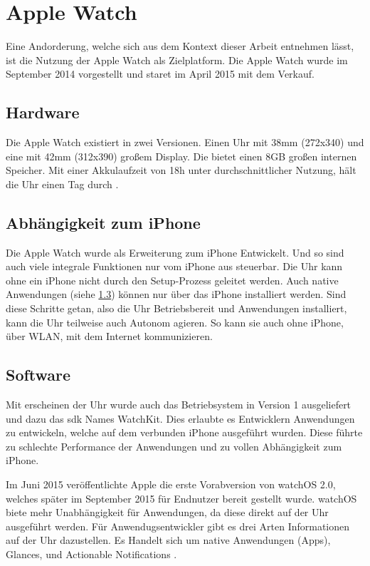 \section{Apple Watch}
\label{ch:apple-watch}
Eine Andorderung, welche sich aus dem Kontext dieser Arbeit entnehmen lässt, ist die Nutzung der Apple Watch als Zielplatform. Die Apple Watch wurde im September 2014 vorgestellt und staret im April 2015 mit dem Verkauf.
\subsection{Hardware}
Die Apple Watch existiert in zwei Versionen. Einen Uhr mit 38mm (272x340) und eine mit 42mm (312x390) großem Display. Die bietet einen 8GB großen internen Speicher. Mit einer Akkulaufzeit von 18h unter durchschnittlicher Nutzung, hält die Uhr einen Tag durch \cite{Riches:2015aa}. 
\subsection{Abhängigkeit zum iPhone}
Die Apple Watch wurde als Erweiterung zum iPhone Entwickelt. Und so sind auch viele integrale Funktionen nur vom iPhone aus steuerbar. Die Uhr kann ohne ein iPhone nicht durch den Setup-Prozess geleitet werden. Auch native Anwendungen (siehe \ref{ch:watch_software}) können nur über das iPhone installiert werden. Sind diese Schritte getan, also die Uhr Betriebsbereit und Anwendungen installiert, kann die Uhr teilweise auch Autonom agieren. So kann sie auch ohne iPhone, über WLAN, mit dem Internet kommunizieren.

\subsection{Software}
\label{ch:watch_software}
Mit erscheinen der Uhr wurde auch das Betriebsystem in Version 1 ausgeliefert und dazu das \gls{sdk} Names WatchKit. Dies erlaubte es Entwicklern Anwendungen zu entwickeln, welche auf dem verbunden iPhone ausgeführt wurden. Diese führte zu schlechte Performance der Anwendungen und zu vollen Abhängigkeit zum iPhone.

Im Juni 2015 veröffentlichte Apple die erste Vorabversion von watchOS 2.0, welches später im September 2015 für Endnutzer bereit gestellt wurde. watchOS biete mehr Unabhängigkeit für Anwendungen, da diese direkt auf der Uhr ausgeführt werden. Für Anwendugsentwickler gibt es drei Arten Informationen auf der Uhr dazustellen. Es Handelt sich um native Anwendungen (Apps), Glances, und Actionable Notifications \cite{Apple:2015devAw}.

